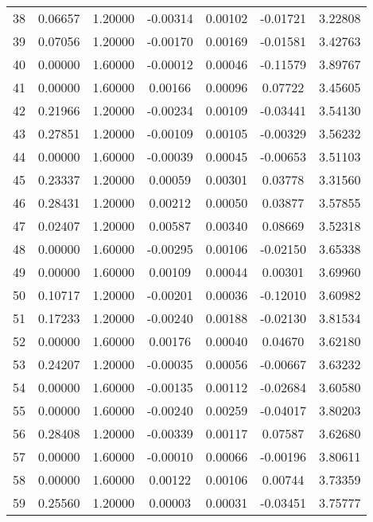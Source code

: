 \begin{longtable}{c c c c c c c}
38  &  0.06657 &      1.20000 & -0.00314 &   0.00102 &  -0.01721 &   3.22808 \\
39  &  0.07056 &      1.20000 & -0.00170 &   0.00169 &  -0.01581 &   3.42763 \\
40  &  0.00000 &      1.60000 & -0.00012 &   0.00046 &  -0.11579 &   3.89767 \\
41  &  0.00000 &      1.60000 &  0.00166 &   0.00096 &   0.07722 &   3.45605 \\
42  &  0.21966 &      1.20000 & -0.00234 &   0.00109 &  -0.03441 &   3.54130 \\
43  &  0.27851 &      1.20000 & -0.00109 &   0.00105 &  -0.00329 &   3.56232 \\
44  &  0.00000 &      1.60000 & -0.00039 &   0.00045 &  -0.00653 &   3.51103 \\
45  &  0.23337 &      1.20000 &  0.00059 &   0.00301 &   0.03778 &   3.31560 \\
46  &  0.28431 &      1.20000 &  0.00212 &   0.00050 &   0.03877 &   3.57855 \\
47  &  0.02407 &      1.20000 &  0.00587 &   0.00340 &   0.08669 &   3.52318 \\
48  &  0.00000 &      1.60000 & -0.00295 &   0.00106 &  -0.02150 &   3.65338 \\
49  &  0.00000 &      1.60000 &  0.00109 &   0.00044 &   0.00301 &   3.69960 \\
50  &  0.10717 &      1.20000 & -0.00201 &   0.00036 &  -0.12010 &   3.60982 \\
51  &  0.17233 &      1.20000 & -0.00240 &   0.00188 &  -0.02130 &   3.81534 \\
52  &  0.00000 &      1.60000 &  0.00176 &   0.00040 &   0.04670 &   3.62180 \\
53  &  0.24207 &      1.20000 & -0.00035 &   0.00056 &  -0.00667 &   3.63232 \\
54  &  0.00000 &      1.60000 & -0.00135 &   0.00112 &  -0.02684 &   3.60580 \\
55  &  0.00000 &      1.60000 & -0.00240 &   0.00259 &  -0.04017 &   3.80203 \\
56  &  0.28408 &      1.20000 & -0.00339 &   0.00117 &   0.07587 &   3.62680 \\
57  &  0.00000 &      1.60000 & -0.00010 &   0.00066 &  -0.00196 &   3.80611 \\
58  &  0.00000 &      1.60000 &  0.00122 &   0.00106 &   0.00744 &   3.73359 \\
59  &  0.25560 &      1.20000 &  0.00003 &   0.00031 &  -0.03451 &   3.75777 \\

\end{longtable}

